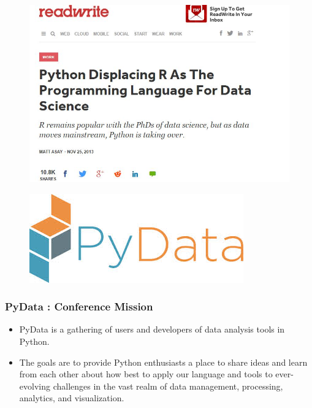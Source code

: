 \documentclass[MASTER.tex]{subfiles}
\begin{document}
 
\begin{frame}
\begin{figure}
\centering
\includegraphics[width=1.05\linewidth]{mjasay}

\end{figure}

\end{frame}
		\begin{frame}
		\begin{figure}
\centering
\includegraphics[width=1.05\linewidth]{pydatalogo}

\end{figure}

	\end{frame}
\begin{frame}
	\frametitle{PyData :  Conference Mission}
	\large
	
	\begin{itemize}
	\item PyData is a gathering of users and developers of data analysis tools in Python. \bigskip
	\item The goals are to provide Python enthusiasts a place to share ideas and learn from each other about how best to apply our language and tools to ever-evolving challenges in the vast realm of data management, processing, analytics, and visualization.
	\end{itemize}

	
\end{frame}
\end{document}
